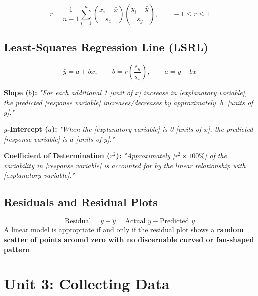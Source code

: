 ﻿\documentclass[11pt,oneside,openany]{book}
\begin{document}
\begin{equation}
  r = \frac{1}{n-1}\sum_{i=1}^n \left(\frac{x_i - \bar{x}}{s_x}\right)\left(\frac{y_i - \bar{y}}{s_y}\right), \qquad -1 \le r \le 1
\end{equation}

\section{Least-Squares Regression Line (LSRL)}
\begin{equation}
  \hat{y} = a + bx, \qquad b = r\left(\frac{s_y}{s_x}\right), \qquad a = \bar{y} - b\bar{x}
\end{equation}

\begin{frqrubricbox}
\textbf{Slope ($b$):} \textit{"For each additional 1 [unit of $x$] increase in [explanatory variable], the predicted [response variable] increases/decreases by approximately $|b|$ [units of $y$]."}

\textbf{$y$-Intercept ($a$):} \textit{"When the [explanatory variable] is 0 [units of $x$], the predicted [response variable] is $a$ [units of $y$]."}

\textbf{Coefficient of Determination ($r^2$):} \textit{"Approximately [r$^2 \times 100\%$] of the variability in [response variable] is accounted for by the linear relationship with [explanatory variable]."}
\end{frqrubricbox}

\section{Residuals and Residual Plots}
\begin{equation}
  \text{Residual} = y - \hat{y} = \text{Actual } y - \text{Predicted } y
\end{equation}
A linear model is appropriate if and only if the residual plot shows a \textbf{random scatter of points around zero with no discernable curved or fan-shaped pattern}.

\chapter{Unit 3: Collecting Data}
\end{document}
